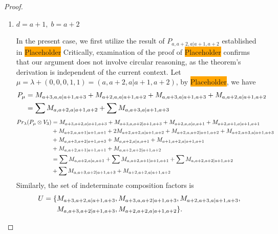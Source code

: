 \begin{proof}
\begin{enumerate}
\begin{enumerate}
\item $ d=a+1, \; b = a+2 $ \par
        In the present case, we first utilize the result of $P_{a,a+2,a|a+1,a+2}$ established in \colorbox{orange}{Placeholder} Critically, examination of the proof of \colorbox{orange}{Placeholder} confirms that our argument does not involve circular reasoning, as the theorem's derivation is independent of the current context. Let $\mu = \lambda + (0,0,0,1,1) =(a,a+2,a|a+1,a+2) $, by \colorbox{orange}{Placeholder}, we have
        \begin{equation}\notag
          \begin{aligned}
            P_\mu &= 
M_{a+3,a,a|a+1,a+3}
+M_{a+2,a,a|a+1,a+2}
+M_{a,a+3,a|a+1,a+3}
+M_{a,a+2,a|a+1,a+2} \\
                  &=
\sum M_{a,a+2,a|a+1,a+2}
+\sum M_{a,a+3,a|a+1,a+3}
          \end{aligned}
        \end{equation}
        \begin{equation}\notag
          \begin{aligned}
            Pr_{\lambda}(P_\mu \otimes V_{3}) &=
M_{a+3,a+2,a|a+1,a+3}
+ M_{a+3,a,a+2|a+1,a+3}
+ M_{a+2,a,a|a,a+1}
+ M_{a+2,a+1,a|a+1,a+1}\\
                                               &
+ M_{a+2,a,a+1|a+1,a+1}
+ 2M_{a+2,a+2,a|a+1,a+2}
+ M_{a+2,a,a+2|a+1,a+2}
+ M_{a+2,a+3,a|a+1,a+3}\\
                                               &
+ M_{a,a+3,a+2|a+1,a+3}
+ M_{a,a+2,a|a,a+1}
+ M_{a+1,a+2,a|a+1,a+1}\\
                                               &
+ M_{a,a+2,a+1|a+1,a+1}
+ M_{a,a+2,a+2|a+1,a+2} \\
                                               &=
\sum M_{a,a+2,a|a,a+1}
+ \sum M_{a,a+2,a+1|a+1,a+1}
+ \sum M_{a,a+2,a+2|a+1,a+2}\\
                                               &
+ \sum M_{a,a+3,a+2|a+1,a+3}
+  M_{a+2,a+2,a|a+1,a+2}
          \end{aligned}
        \end{equation}
      Similarly, the set of indeterminate composition factors is
\begin{equation}\notag
  \begin{aligned}
      U = \{
&M_{a+3,a+2,a|a+1,a+3},
M_{a+3,a,a+2|a+1,a+3},
M_{a+2,a+3,a|a+1,a+3}, \\
&M_{a,a+3,a+2|a+1,a+3},
M_{a+2,a+2,a|a+1,a+2}
\}.
  \end{aligned}

\end{equation}
\end{enumerate}
\end{enumerate}
\end{proof}
